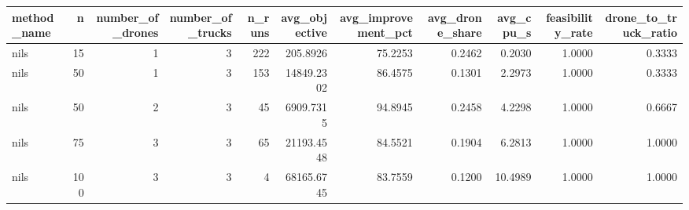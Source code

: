 \begin{tabular}{lrrrrrrrrrr}
\toprule
method_name & n & number_of_drones & number_of_trucks & n_runs & avg_objective & avg_improvement_pct & avg_drone_share & avg_cpu_s & feasibility_rate & drone_to_truck_ratio \\
\midrule
nils & 15 & 1 & 3 & 222 & 205.8926 & 75.2253 & 0.2462 & 0.2030 & 1.0000 & 0.3333 \\
nils & 50 & 1 & 3 & 153 & 14849.2302 & 86.4575 & 0.1301 & 2.2973 & 1.0000 & 0.3333 \\
nils & 50 & 2 & 3 & 45 & 6909.7315 & 94.8945 & 0.2458 & 4.2298 & 1.0000 & 0.6667 \\
nils & 75 & 3 & 3 & 65 & 21193.4548 & 84.5521 & 0.1904 & 6.2813 & 1.0000 & 1.0000 \\
nils & 100 & 3 & 3 & 4 & 68165.6745 & 83.7559 & 0.1200 & 10.4989 & 1.0000 & 1.0000 \\
\bottomrule
\end{tabular}
